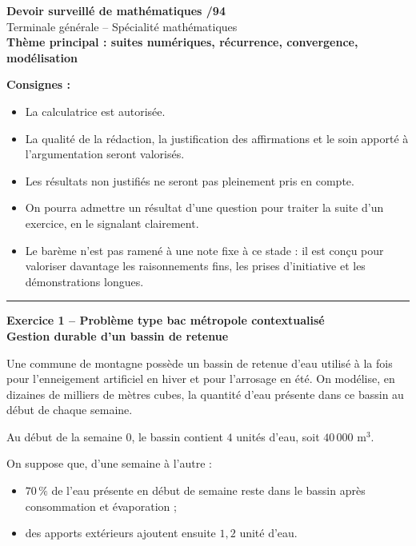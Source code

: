 \documentclass[11pt,a4paper]{article}
\begin{document}
\begin{center}
    {\LARGE \textbf{Devoir surveillé de mathématiques /94}}\\[0.3cm]
    {\large Terminale générale -- Spécialité mathématiques}\\[0.2cm]
    \textbf{Thème principal : suites numériques, récurrence, convergence, modélisation}\\[0.3cm]
\end{center}

\vspace{0.2cm}

\noindent\textbf{Consignes :}
\begin{itemize}[leftmargin=0.7cm]
    \item La calculatrice est autorisée.
    \item La qualité de la rédaction, la justification des affirmations et le soin apporté à l’argumentation seront valorisés.
    \item Les résultats non justifiés ne seront pas pleinement pris en compte.
    \item On pourra admettre un résultat d’une question pour traiter la suite d’un exercice, en le signalant clairement.
    \item Le barème n’est pas ramené à une note fixe à ce stade : il est conçu pour valoriser davantage les raisonnements fins, les prises d’initiative et les démonstrations longues.
\end{itemize}

\vspace{0.2cm}

\hrule
\vspace{0.3cm}

\begin{center}
    \textbf{\large Exercice 1 -- Problème type bac métropole contextualisé}\\
    \textbf{Gestion durable d’un bassin de retenue}
\end{center}

Une commune de montagne possède un bassin de retenue d’eau utilisé à la fois pour l’enneigement artificiel en hiver et pour l’arrosage en été. On modélise, en dizaines de milliers de mètres cubes, la quantité d’eau présente dans ce bassin au début de chaque semaine.

Au début de la semaine $0$, le bassin contient $4$ unités d’eau, soit $40\,000$ m$^3$.

On suppose que, d’une semaine à l’autre :
\begin{itemize}[leftmargin=0.7cm]
    \item $70\,\%$ de l’eau présente en début de semaine reste dans le bassin après consommation et évaporation ;
    \item des apports extérieurs ajoutent ensuite $1{,}2$ unité d’eau.
\end{itemize}
\end{document}
